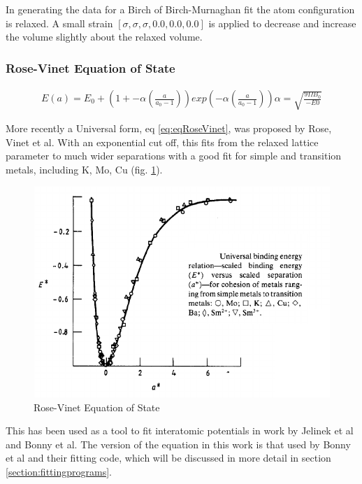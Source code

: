 In generating the data for a Birch of Birch-Murnaghan fit the atom configuration is relaxed.  A small strain $\left[\sigma, \sigma, \sigma, 0.0, 0.0, 0.0\right]$ is applied to decrease and increase the volume slightly about the relaxed volume.


\FloatBarrier
\subsubsection{Rose-Vinet Equation of State}

\begin{equation}
\begin{split}
E(a) = E_0 + \left(1 + -\alpha \left(\frac{a}{a_0 - 1}\right)\right) exp\left(-\alpha \left(\frac{a}{a_0 - 1}\right)\right) 
\alpha = \sqrt{\frac{9 \Omega B_0}{-E0}}
\end{split}
\label{eq:eqRoseVinet}
\end{equation}

More recently a Universal form, eq \ref{eq:eqRoseVinet}, was proposed by Rose, Vinet et al\cite{rosevinet}.  With an exponential cut off, this fits from the relaxed lattice parameter to much wider separations with a good fit for simple and transition metals, including K, Mo, Cu (fig. \ref{fig:rosevinet}).

\begin{figure}[htbp]
  \begin{center}
    \includegraphics[width=.5\linewidth]{chapters/interatomic_potential_fitting/images/rosevinet.png}%
    \caption{Rose-Vinet Equation of State}
    \label{fig:rosevinet}
  \end{center}
\end{figure}

This has been used as a tool to fit interatomic potentials in work by Jelinek et al\cite{meamalsibaskes} and Bonny et al\cite{ipbonny}.  The version of the equation in this work is that used by Bonny et al and their fitting code, which will be discussed in more detail in section \ref{section:fittingprograms}.




